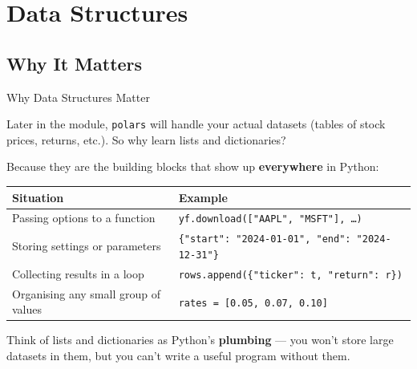 \documentclass[9pt,aspectratio=169]{beamer}
\begin{document}
\section{Data Structures}
\subsection{Why It Matters}

\begin{frame}{Why Data Structures Matter}

Later in the module, \texttt{polars} will handle your actual datasets (tables of stock prices, returns, etc.). So why learn lists and dictionaries?

\bigskip

Because they are the \alert{building blocks} that show up \textbf{everywhere} in Python:

\medskip

\begin{tabular}{@{}lp{7.5cm}@{}}
\toprule
\textbf{Situation} & \textbf{Example} \\
\midrule
Passing options to a function & \texttt{yf.download(["AAPL", "MSFT"], \ldots)} \\[0.3em]
Storing settings or parameters & \texttt{\{"start": "2024-01-01", "end": "2024-12-31"\}} \\[0.3em]
Collecting results in a loop & \texttt{rows.append(\{"ticker": t, "return": r\})} \\[0.3em]
Organising any small group of values & \texttt{rates = [0.05, 0.07, 0.10]} \\
\bottomrule
\end{tabular}

\bigskip

\begin{highlightbox}
\centering
Think of lists and dictionaries as Python's \textbf{plumbing} --- you won't store large datasets in them, but you can't write a useful program without them.
\end{highlightbox}

\end{frame}
\end{document}
